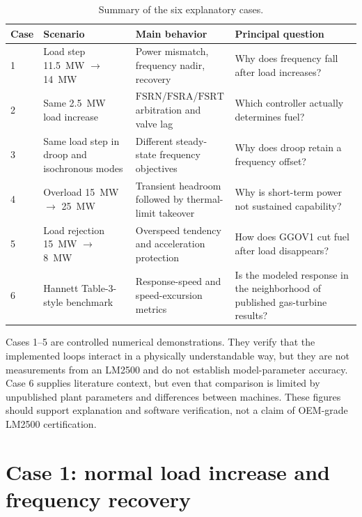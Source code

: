 \documentclass[11pt]{article}
\newcommand{\fsrn}{\ensuremath{\mathrm{FSRN}}}
\newcommand{\fsra}{\ensuremath{\mathrm{FSRA}}}
\newcommand{\fsrt}{\ensuremath{\mathrm{FSRT}}}
\begin{document}
\begin{table}[htbp]
\centering
\caption{Summary of the six explanatory cases.}
\label{tab:cases}
\small
\begin{tabular}{@{}p{}p{}p{}p{}@{}}
\toprule
Case & Scenario & Main behavior & Principal question \\
\midrule
1 & Load step \SI{11.5}{MW} $\rightarrow$ \SI{14}{MW} & Power mismatch, frequency nadir, recovery & Why does frequency fall after load increases? \\
2 & Same \SI{2.5}{MW} load increase & \fsrn/\fsra/\fsrt arbitration and valve lag & Which controller actually determines fuel? \\
3 & Same load step in droop and isochronous modes & Different steady-state frequency objectives & Why does droop retain a frequency offset? \\
4 & Overload \SI{15}{MW} $\rightarrow$ \SI{25}{MW} & Transient headroom followed by thermal-limit takeover & Why is short-term power not sustained capability? \\
5 & Load rejection \SI{15}{MW} $\rightarrow$ \SI{8}{MW} & Overspeed tendency and acceleration protection & How does GGOV1 cut fuel after load disappears? \\
6 & Hannett Table-3-style benchmark & Response-speed and speed-excursion metrics & Is the modeled response in the neighborhood of published gas-turbine results? \\
\bottomrule
\end{tabular}
\end{table}

\begin{cautionbox}
Cases 1--5 are controlled numerical demonstrations.  They verify that the
implemented loops interact in a physically understandable way, but they are
not measurements from an LM2500 and do not establish model-parameter accuracy.
Case 6 supplies literature context, but even that comparison is limited by
unpublished plant parameters and differences between machines.  These figures
should support explanation and software verification, not a claim of OEM-grade
LM2500 certification.
\end{cautionbox}

\section{Case 1: normal load increase and frequency recovery}
\end{document}
